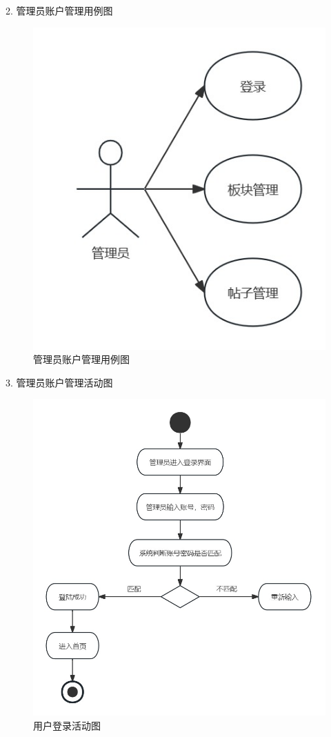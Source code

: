 \documentclass[UTF8]{ctexart}
\begin{document}
2. 管理员账户管理用例图
\begin{figure}[H]
  \centering
  \includegraphics[scale=0.3]{用例图/管理员用例图.jpg}
  \caption{管理员账户管理用例图}
\end{figure}

3. 管理员账户管理活动图
\begin{figure}[H]
  \centering
  \includegraphics[scale=0.25]{活动图/管理员登录活动图.jpg}
  \caption{用户登录活动图}
\end{figure}
\end{document}
